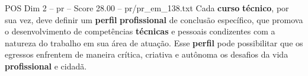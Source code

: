 \begin{textsample}{POS Dim 2 – pr – Score 28.00 – pr/pr\_em\_138.txt}
Cada \textbf{curso} \textbf{técnico}, por sua vez, deve definir um \textbf{perfil} \textbf{profissional} de conclusão específico, que promova o desenvolvimento de competências \textbf{técnicas} e pessoais condizentes com a natureza do trabalho em sua área de atuação.
Esse \textbf{perfil} pode possibilitar que os egressos enfrentem de maneira crítica, criativa e autônoma os desafios da vida \textbf{profissional} e cidadã.

\end{textsample}
